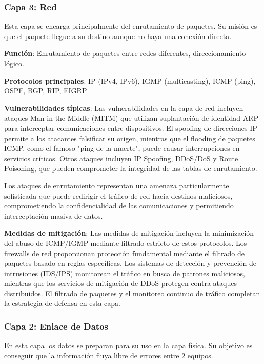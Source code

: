 \begin{itemize}
\subsubsection{Capa 3: Red}

Esta capa se encarga principalmente del enrutamiento de paquetes. Su misión es que el paquete llegue a su destino aunque no haya una conexión directa.

\textbf{Función}: Enrutamiento de paquetes entre redes diferentes, direccionamiento lógico.

\textbf{Protocolos principales}: IP (IPv4, IPv6), IGMP (multicasting), ICMP (ping), OSPF, BGP, RIP, EIGRP

\textbf{Vulnerabilidades típicas}:
Las vulnerabilidades en la capa de red incluyen ataques Man-in-the-Middle (MITM) que utilizan suplantación de identidad ARP para interceptar comunicaciones entre dispositivos. El spoofing de direcciones IP permite a los atacantes falsificar su origen, mientras que el flooding de paquetes ICMP, como el famoso "ping de la muerte", puede causar interrupciones en servicios críticos. Otros ataques incluyen IP Spoofing, DDoS/DoS y Route Poisoning, que pueden comprometer la integridad de las tablas de enrutamiento.

Los ataques de enrutamiento representan una amenaza particularmente sofisticada que puede redirigir el tráfico de red hacia destinos maliciosos, comprometiendo la confidencialidad de las comunicaciones y permitiendo interceptación masiva de datos.

\textbf{Medidas de mitigación}:
Las medidas de mitigación incluyen la minimización del abuso de ICMP/IGMP mediante filtrado estricto de estos protocolos. Los firewalls de red proporcionan protección fundamental mediante el filtrado de paquetes basado en reglas específicas. Los sistemas de detección y prevención de intrusiones (IDS/IPS) monitorean el tráfico en busca de patrones maliciosos, mientras que los servicios de mitigación de DDoS protegen contra ataques distribuidos. El filtrado de paquetes y el monitoreo continuo de tráfico completan la estrategia de defensa en esta capa.

\subsubsection{Capa 2: Enlace de Datos}

En esta capa los datos se preparan para su uso en la capa física. Su objetivo es conseguir que la información fluya libre de errores entre 2 equipos.


\end{itemize}
